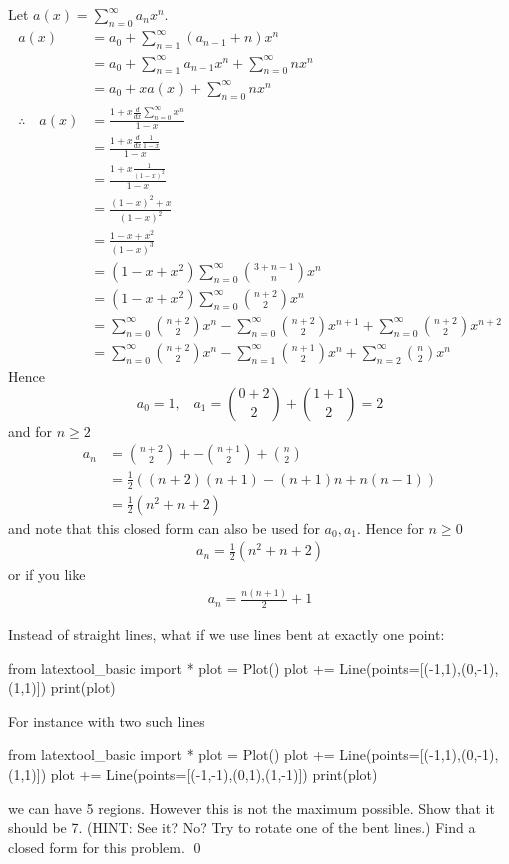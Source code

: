 \newpage
Let $a(x) = \sum_{n=0}^\infty a_n x^n$.
\begin{align*}
a(x) 
&= a_0 + \sum_{n=1}^\infty (a_{n-1} + n) x^n \\
&= a_0 + \sum_{n=1}^\infty a_{n-1} x^n + \sum_{n=0}^\infty n x^n \\
&= a_0 + x a(x) + \sum_{n=0}^\infty n x^n \\
\therefore\,\,\,\,\,\,
a(x) 
&= 
\frac{1 + x\frac{d}{dx} \sum_{n=0}^\infty x^n}{1 - x} \\
&=\frac{1 + x\frac{d}{dx} \frac{1}{1-x} }{1 - x} \\
&=\frac{1 + x \frac{1}{(1-x)^2} }{1 - x} \\
&=\frac{(1-x)^2 + x}{(1 - x)^2} \\
&=\frac{1 - x + x^2}{(1 - x)^3} \\
&=(1 - x + x^2) \sum_{n=0}^\infty \binom{3 + n - 1}{n} x^n \\
&=(1 - x + x^2) \sum_{n=0}^\infty \binom{n + 2}{2} x^n \\
&=
\sum_{n=0}^\infty \binom{n + 2}{2} x^n
- \sum_{n=0}^\infty \binom{n + 2}{2} x^{n+1}
+ \sum_{n=0}^\infty \binom{n + 2}{2} x^{n+2} \\
&=
\sum_{n=0}^\infty \binom{n + 2}{2} x^n
- \sum_{n=1}^\infty \binom{n + 1}{2} x^{n}
+ \sum_{n=2}^\infty \binom{n}{2} x^{n}
\end{align*}
Hence
\[
a_0 = 1, \,\,\,\,\,
a_1 = \binom{0 + 2}{2} + \binom{1 + 1}{2} = 2
\]
and for $n \geq 2$
\begin{align*}
a_n 
&= 
\binom{n + 2}{2} +
- \binom{n + 1}{2}
+ \binom{n}{2} \\
&= \frac{1}{2} 
((n+2)(n+1)
- (n+1)n
+ n(n-1)) \\
&= \frac{1}{2} 
(n^2 
+ n
+ 2)
\end{align*}
and note that this closed form 
can also be used for $a_0, a_1$.
Hence for $n \geq 0$
\begin{align*}
a_n 
= \frac{1}{2}
(n^2 
+ n
+ 2)
\end{align*}
or if you like
\begin{align*}
a_n 
= \frac{n(n+1)}{2} + 1
\end{align*}


\newpage
\begin{ex}
Instead of straight lines, what if we use lines bent at exactly one
point:
\begin{python}
from latextool_basic import *
plot = Plot()
plot += Line(points=[(-1,1),(0,-1),(1,1)])
print(plot)
\end{python}
For instance with two such lines
\begin{python}
from latextool_basic import *
plot = Plot()
plot += Line(points=[(-1,1),(0,-1),(1,1)])
plot += Line(points=[(-1,-1),(0,1),(1,-1)])
print(plot)
\end{python}
we can have 5 regions.
However this is not the maximum possible.
Show that it should be 7.
(HINT: See it? No?
Try to rotate one of the bent lines.)
Find a closed form for this problem.
\qed
\end{ex}

